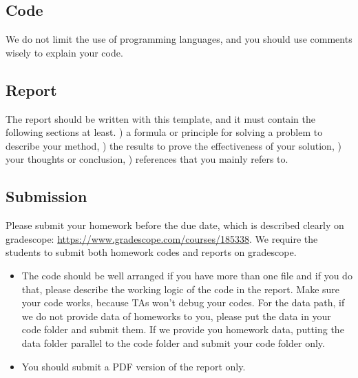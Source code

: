 \documentclass[10pt,twocolumn,letterpaper]{article}
\begin{document}
 \subsection{Code}
 We do not limit the use of programming languages, and you should use comments wisely to explain your code.
 
 \subsection{Report}
 The report should be written with this template, and it must contain the following sections at least. ) a formula or principle for solving a problem to describe your method, ) the results to prove the effectiveness of your solution, ) your thoughts or conclusion, ) references that you mainly refers to.
 
\subsection{Submission}
Please submit your homework before the due date, which is described clearly on gradescope: \url{https://www.gradescope.com/courses/185338}. We require the students to submit both homework codes and reports on gradescope.
 \begin{itemize}
\item The code should be well arranged if you have more than one file and if you do that, please describe the working logic of the code in the report. Make sure your code works, because TAs won't debug your codes. For the data path, if we do not provide data of homeworks to you, please put the data in your code folder and submit them. If we provide you homework data, putting the data folder parallel to the code folder and submit your code folder only. 
 \end{itemize}
\begin{itemize}
\item You should submit a PDF version of the report only.
\end{itemize}


{\small


}
\end{document}
